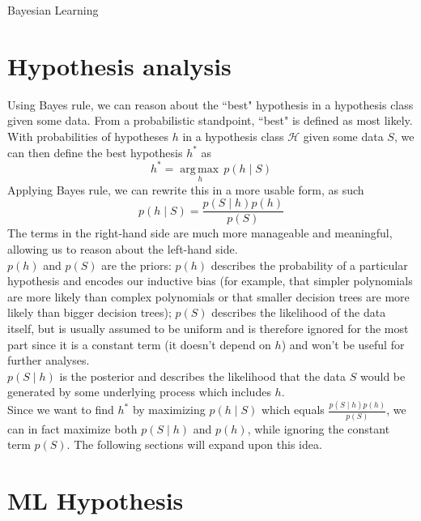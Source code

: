 \documentclass[12pt]{article}
\newcommand{\argmax}[1]{\underset{#1}{\operatorname{arg\,max\,}}}
\begin{document}
\begin{center}
	\LARGE{Bayesian Learning}
\end{center}

\section{Hypothesis analysis}

Using Bayes rule, we can reason about the ``best" hypothesis in a hypothesis class given some data. From a probabilistic standpoint, ``best" is defined as most likely. With probabilities of hypotheses $h$ in a hypothesis class $\mathcal{H}$ given some data $S$, we can then define the best hypothesis $h^*$ as
\[ h^* = \argmax{h}p(h \mid S) \]
Applying Bayes rule, we can rewrite this in a more usable form, as such
\[ p(h \mid S) = \frac{p(S \mid h)p(h)}{p(S)} \]
The terms in the right-hand side are much more manageable and meaningful, allowing us to reason about the left-hand side.
\\\newline
$p(h)$ and $p(S)$ are the priors: $p(h)$ describes the probability of a particular hypothesis and encodes our inductive bias (for example, that simpler polynomials are more likely than complex polynomials or that smaller decision trees are more likely than bigger decision trees); $p(S)$ describes the likelihood of the data itself, but is usually assumed to be uniform and is therefore ignored for the most part since it is a constant term (it doesn't depend on $h$) and won't be useful for further analyses.
\\\newline
$p(S \mid h)$ is the posterior and describes the likelihood that the data $S$ would be generated by some underlying process which includes $h$.
\\\newline
Since we want to find $h^*$ by maximizing $p(h \mid S)$ which equals $\frac{p(S \mid h)p(h)}{p(S)}$, we can in fact maximize both $p(S \mid h)$ and $p(h)$, while ignoring the constant term $p(S)$. The following sections will expand upon this idea.

\section{ML Hypothesis}
\end{document}
